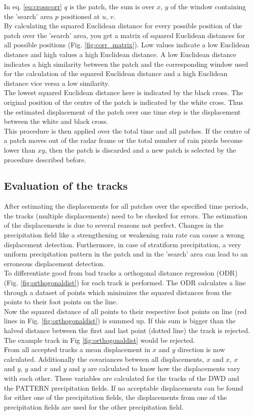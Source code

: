 \documentclass[11pt,twoside,a4paper,fleqn,x11names]{report}
\numberwithin{equation}{chapter}
\numberwithin{figure}{chapter}
\numberwithin{table}{chapter}
\begin{document}
In eq. \ref{eq:crosscorr} $q$ is the patch, the sum is over $x$, $y$ of the window containing the 'search' area $p$ positioned at $u$, $v$.\\
By calculating the squared Euclidean distance for every possible position of the patch over the 'search' area, you get a matrix of squared Euclidean distances for all possible positions (Fig. \ref{fig:corr_matrix}). Low values indicate a low Euclidean distance and high values a high Euclidean distance. A low Euclidean distance indicates a high similarity between the patch and the corresponding window used for the calculation of the squared Euclidean distance and a high Euclidean distance vice versa a low similarity.\\
The lowest squared Euclidean distance here is indicated by the black cross. The original position of the centre of the patch is indicated by the white cross. Thus the estimated displacement of the patch over one time step is the displacement between the white and black cross.\\
This procedure is then applied over the total time and all patches. If the centre of a patch moves out of the radar frame or the total number of rain pixels become lower than $xy$, then the patch is discarded and a new patch is selected by the procedure described before. 
\subsection{Evaluation of the tracks}
After estimating the displacements for all patches over the specified time periods, the tracks (multiple displacements) need to be checked for errors. The estimation of the displacements is due to several reasons not perfect. Changes in the precipitation field like a strengthening or weakening rain rate can cause a wrong displacement detection. Furthermore, in case of stratiform precipitation, a very uniform precipitation pattern in the patch and in the 'search' area can lead to an erroneous displacement detection.\\
To differentiate good from bad tracks a orthogonal distance regression (ODR) (Fig. \ref{fig:orthogonaldist}) for each track is performed. The ODR calculates a line through a dataset of points which minimizes the squared distances from the points to their foot points on the line. \\
Now the squared distance of all points to their respective foot points on line (red lines in Fig. \ref{fig:orthogonaldist}) is summed up. If this sum is bigger than the halved distance between the first and last point (dotted line) the track is rejected. The example track in Fig \ref{fig:orthogonaldist} would be rejected. \\
From all accepted tracks a mean displacement in $x$ and $y$ direction is now calculated. Additionally the covariances between all displacements, $x$ and $x$,  $x$ and $y$, $y$ and $x$ and $y$ and $y$ are calculated to know how the displacements vary with each other. These variables are calculated for the tracks of the DWD and the PATTERN precipitation fields. 
If no acceptable displacements can be found for either one of the precipitation fields, the displacements from one of the precipitation fields are used for the other precipitation field.
\end{document}
